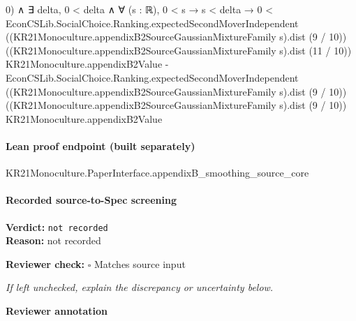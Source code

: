\documentclass[10pt]{article}
\newcommand{\reviewerbox}{%
  \par\noindent\fbox{\parbox{0.96\linewidth}{\rule{0pt}{0.38in}}}\par
}
\newcommand{\reviewmatch}[1]{%
  \par\noindent\textbf{Reviewer check:} $\square$\; #1\par
  \noindent\emph{If left unchecked, explain the discrepancy or uncertainty below.}\par
}
\begin{document}
\begin{ReviewVerbatim}
                                  0) ∧
                      ∃ delta,
                        0 < delta ∧
                          ∀ (s : ℝ),
                            0 < s →
                              s < delta →
                                0 <
                                  EconCSLib.SocialChoice.Ranking.expectedSecondMoverIndependent
                                      ((KR21Monoculture.appendixB2SourceGaussianMixtureFamily s).dist (9 / 10))
                                      ((KR21Monoculture.appendixB2SourceGaussianMixtureFamily s).dist (11 / 10))
                                      KR21Monoculture.appendixB2Value -
                                    EconCSLib.SocialChoice.Ranking.expectedSecondMoverIndependent
                                      ((KR21Monoculture.appendixB2SourceGaussianMixtureFamily s).dist (9 / 10))
                                      ((KR21Monoculture.appendixB2SourceGaussianMixtureFamily s).dist (9 / 10))
                                      KR21Monoculture.appendixB2Value
\end{ReviewVerbatim}

\paragraph{Lean proof endpoint (built separately)}\begin{ReviewVerbatim}
KR21Monoculture.PaperInterface.appendixB_smoothing_source_core
\end{ReviewVerbatim}

\paragraph{Recorded source-to-Spec screening}
\textbf{Verdict:} \texttt{not recorded}
\\
\textbf{Reason:} not recorded
\reviewmatch{Matches source input}
\noindent\textbf{Reviewer annotation}\par
\reviewerbox
\end{document}
